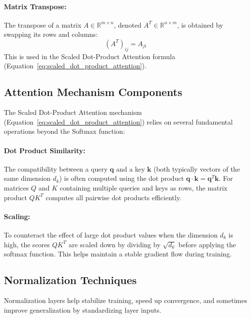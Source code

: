 \begin{appendices}
  \paragraph{Matrix Transpose:}
  The transpose of a matrix \( A \in \mathbb{R}^{m \times n} \), denoted \( A^T \in \mathbb{R}^{n \times m} \), is obtained by swapping its rows and columns:
  \begin{equation}
    (A^T)_{ij} = A_{ji}
  \end{equation}
  This is used in the Scaled Dot-Product Attention formula (Equation~\ref{eq:scaled_dot_product_attention}).

  \subsection{Attention Mechanism Components}
  The Scaled Dot-Product Attention mechanism (Equation~\ref{eq:scaled_dot_product_attention}) relies on several fundamental operations beyond the Softmax function:

  \paragraph{Dot Product Similarity:}
  The compatibility between a query \( \bm{q} \) and a key \( \bm{k} \) (both typically vectors of the same dimension \( d_k \)) is often computed using the dot product \( \bm{q} \cdot \bm{k} = \bm{q}^T \bm{k} \). For matrices \( Q \) and \( K \) containing multiple queries and keys as rows, the matrix product \( QK^T \) computes all pairwise dot products efficiently.

  \paragraph{Scaling:}
  To counteract the effect of large dot product values when the dimension \( d_k \) is high, the scores \( QK^T \) are scaled down by dividing by \( \sqrt{d_k} \) before applying the softmax function. This helps maintain a stable gradient flow during training.

  \subsection{Normalization Techniques}
  Normalization layers help stabilize training, speed up convergence, and sometimes improve generalization by standardizing layer inputs.


\end{appendices}
